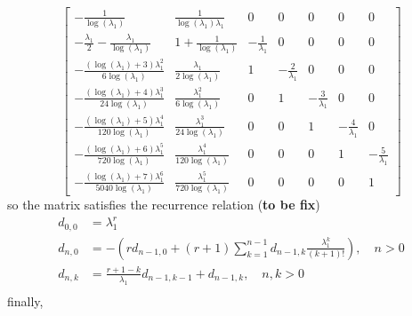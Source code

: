 \begin{displaymath}
\left[\begin{matrix}- \frac{1}{\log{\left (\lambda_{1} \right )}} & \frac{1}{\log{\left (\lambda_{1} \right )} \lambda_{1}} & 0 & 0 & 0 & 0 & 0\\- \frac{\lambda_{1}}{2} - \frac{\lambda_{1}}{\log{\left (\lambda_{1} \right )}} & 1 + \frac{1}{\log{\left (\lambda_{1} \right )}} & - \frac{1}{\lambda_{1}} & 0 & 0 & 0 & 0\\- \frac{\left(\log{\left (\lambda_{1} \right )} + 3\right) \lambda_{1}^{2}}{6 \log{\left (\lambda_{1} \right )}} & \frac{\lambda_{1}}{2 \log{\left (\lambda_{1} \right )}} & 1 & - \frac{2}{\lambda_{1}} & 0 & 0 & 0\\- \frac{\left(\log{\left (\lambda_{1} \right )} + 4\right) \lambda_{1}^{3}}{24 \log{\left (\lambda_{1} \right )}} & \frac{\lambda_{1}^{2}}{6 \log{\left (\lambda_{1} \right )}} & 0 & 1 & - \frac{3}{\lambda_{1}} & 0 & 0\\- \frac{\left(\log{\left (\lambda_{1} \right )} + 5\right) \lambda_{1}^{4}}{120 \log{\left (\lambda_{1} \right )}} & \frac{\lambda_{1}^{3}}{24 \log{\left (\lambda_{1} \right )}} & 0 & 0 & 1 & - \frac{4}{\lambda_{1}} & 0\\- \frac{\left(\log{\left (\lambda_{1} \right )} + 6\right) \lambda_{1}^{5}}{720 \log{\left (\lambda_{1} \right )}} & \frac{\lambda_{1}^{4}}{120 \log{\left (\lambda_{1} \right )}} & 0 & 0 & 0 & 1 & - \frac{5}{\lambda_{1}}\\- \frac{\left(\log{\left (\lambda_{1} \right )} + 7\right) \lambda_{1}^{6}}{5040 \log{\left (\lambda_{1} \right )}} & \frac{\lambda_{1}^{5}}{720 \log{\left (\lambda_{1} \right )}} & 0 & 0 & 0 & 0 & 1\end{matrix}\right]
\end{displaymath}
so the matrix satisfies the recurrence relation (\textbf{to be fix})
\begin{displaymath}
\begin{split}
d_{0,0}&=\lambda_{1}^{r}\\
d_{n,0}&=-\left(r d_{n-1, 0} + (r+1)\sum_{k=1}^{n-1}{d_{n-1, k}\frac{\lambda_{1}^{k}}{(k+1)!}}\right), \quad n>0 \\
d_{n,k}&=\frac{r+1-k}{\lambda_{1}}d_{n-1, k-1} + d_{n-1,k}, \quad n,k > 0\\
\end{split}
\end{displaymath}
finally,
